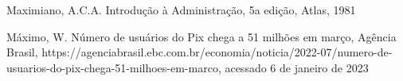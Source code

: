 \documentclass[
12pt,		%
openright,	%
twoside,  %
a4paper,			%
chapter=TITLE,		%
english,			%
french,				%
spanish,			%
brazil				%
]{USPSC-classe/USPSC}
\begin{document}
\begin{flushleft}
\begin{flushleft}
\begin{flushleft}
\begin{flushleft}
\begin{flushleft}
\begin{flushleft}
\begin{flushleft}
\begin{flushleft}
\begin{flushleft}
[MAXIMIANO, 1981] Maximiano, A.C.A. Introdu\c{c}\~ao \`a Administra\c{c}\~ao, 5a edi\c{c}\~ao, Atlas, 1981
\end{flushleft}


\end{flushleft}


\end{flushleft}


\end{flushleft}


\end{flushleft}


\end{flushleft}


\end{flushleft}


\end{flushleft}


\end{flushleft}


\begin{flushleft}
\begin{flushleft}
\begin{flushleft}
\begin{flushleft}
\begin{flushleft}
\begin{flushleft}
\begin{flushleft}
\begin{flushleft}
\begin{flushleft}
[M\'AXIMO, 2022] M\'aximo, W. N\'umero de usu\'arios do Pix chega a 51 milh\~oes em mar\c{c}o, Ag\^encia Brasil, https://agenciabrasil.ebc.com.br/economia/noticia/2022-07/numero-de-usuarios-do-pix-chega-51-milhoes-em-marco, acessado 6 de janeiro de 2023
\end{flushleft}


\end{flushleft}


\end{flushleft}


\end{flushleft}


\end{flushleft}


\end{flushleft}


\end{flushleft}


\end{flushleft}


\end{flushleft}
\end{document}

